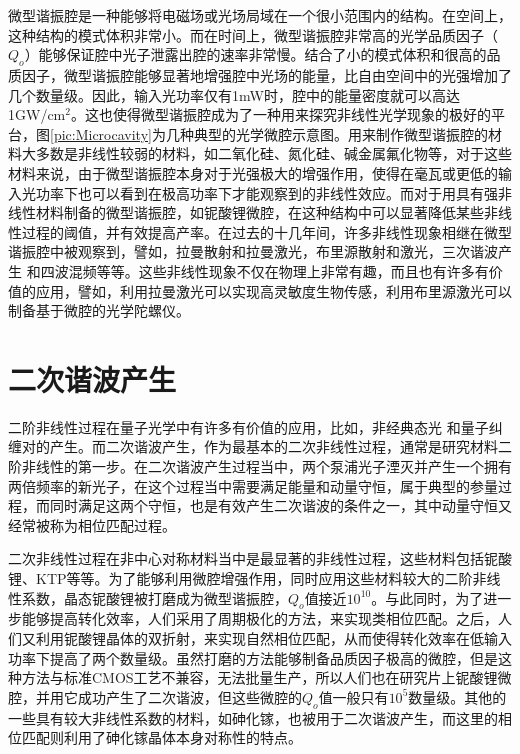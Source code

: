 微型谐振腔是一种能够将电磁场或光场局域在一个很小范围内的结构。在空间上，这种结构的模式体积非常小。而在时间上，微型谐振腔非常高的光学品质因子（$Q_o$）能够保证腔中光子泄露出腔的速率非常慢。结合了小的模式体积和很高的品质因子，微型谐振腔能够显著地增强腔中光场的能量，比自由空间中的光强增加了几个数量级。因此，输入光功率仅有1mW时，腔中的能量密度就可以高达1GW/cm$^2$\cite{vahala2003optical}。这也使得微型谐振腔成为了一种用来探究非线性光学现象的极好的平台，图\ref{pic:Microcavity}为几种典型的光学微腔示意图。用来制作微型谐振腔的材料大多数是非线性较弱的材料，如二氧化硅、氮化硅、碱金属氟化物等，对于这些材料来说，由于微型谐振腔本身对于光强极大的增强作用，使得在毫瓦或更低的输入光功率下也可以看到在极高功率下才能观察到的非线性效应。而对于用具有强非线性材料制备的微型谐振腔，如铌酸锂微腔，在这种结构中可以显著降低某些非线性过程的阈值，并有效提高产率。在过去的十几年间，许多非线性现象相继在微型谐振腔中被观察到，譬如，拉曼散射和拉曼激光\cite{spillane2002ultralow, cai2000fiber, kippenberg2004ultralow}，布里源散射和激光\cite{li2012characterization, li2013microwave, li2014low, loh2015dual}，三次谐波产生\cite{carmon2007visible, farnesi2014optical}	和四波混频\cite{kippenberg2004kerr}等等。这些非线性现象不仅在物理上非常有趣，而且也有许多有价值的应用，譬如，利用拉曼激光可以实现高灵敏度生物传感\cite{ozdemir2014highly}，利用布里源激光可以制备基于微腔的光学陀螺仪\cite{li2015microresonator}。

\section{二次谐波产生}

二阶非线性过程在量子光学中有许多有价值的应用，比如，非经典态光\cite{scully1999quantum}	和量子纠缠对的产生\cite{xu2008second}。而二次谐波产生，作为最基本的二次非线性过程，通常是研究材料二阶非线性的第一步。在二次谐波产生过程当中，两个泵浦光子湮灭并产生一个拥有两倍频率的新光子\cite{boyd2003nonlinear}，在这个过程当中需要满足能量和动量守恒，属于典型的参量过程，而同时满足这两个守恒，也是有效产生二次谐波的条件之一，其中动量守恒又经常被称为相位匹配过程。

	二次非线性过程在非中心对称材料当中是最显著的非线性过程，这些材料包括铌酸锂、KTP等等。为了能够利用微腔增强作用，同时应用这些材料较大的二阶非线性系数，晶态铌酸锂被打磨成为微型谐振腔，$Q_o$值接近$10^10$\cite{ilchenko2004nonlinear}。与此同时，为了进一步能够提高转化效率，人们采用了周期极化的方法，来实现类相位匹配。之后，人们又利用铌酸锂晶体的双折射，来实现自然相位匹配，从而使得转化效率在低输入功率下提高了两个数量级\cite{furst2010naturally}。虽然打磨的方法能够制备品质因子极高的微腔，但是这种方法与标准CMOS工艺不兼容，无法批量生产，所以人们也在研究片上铌酸锂微腔，并用它成功产生了二次谐波\cite{lin2015second}，但这些微腔的$Q_o$值一般只有$10^5$数量级。其他的一些具有较大非线性系数的材料，如砷化镓，也被用于二次谐波产生，而这里的相位匹配则利用了砷化镓晶体本身对称性的特点\cite{kuo2014second}。
	
